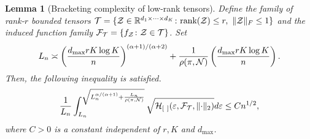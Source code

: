 \documentclass[11pt]{article}
\theoremstyle{plain}
\newtheorem{lem}{Lemma}[section]
\theoremstyle{definition}
\def\rank{\textup{rank}}
\begin{document}
\begin{lem}[Bracketing complexity of low-rank tensors] \label{lem:metric}
Define the family of rank-$r$ bounded tensors $\tT=\{\tZ\in\mathbb{R}^{d_1\times \cdots \times d_K}\colon \rank(\tZ)\leq r, \ \FnormSize{}{\tZ}\leq 1\}$ and the induced function family $\mathcal{F}_{\mathcal{T}} = \{f_{\mathcal{Z}}\colon \mathcal{Z}\in\mathcal{T}\}$.  Set 
\begin{equation}\label{eq:specification}
L_n\asymp \left({d_{\max}rK\log K \over n } \right)^{(\alpha+1)/(\alpha+2)} + {1\over \rho (\pi, \mathcal{N})}\left({d_{\max}rK\log K \over n } \right).
\end{equation}
Then, the following inequality is satisfied.
\begin{equation}\label{eq:L}
{1\over L_n}\int^{\sqrt{L_n^{\alpha/(\alpha+1)}+{L_n\over \rho (\pi, \mathcal{N})}}}_{L_n} \sqrt{\mathcal{H}_{[\ ]}(\varepsilon, \mathcal{F}_{\mathcal{T}} ,\lVert\cdot\rVert_2) }d\varepsilon \leq Cn^{1/2},
\end{equation}
where $C>0$ is a constant independent of $r,K$  and $d_{\text{max}}$.
\end{lem}
\end{document}
